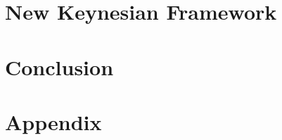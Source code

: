 \documentclass[12pt]{article}
\newcommand{\1}{\mathbbm 1}
\begin{document}
		
		\newpage
		
		
			
		
		\section{New Keynesian Framework}
		
		\newpage
		
		\section{Conclusion}
		
		
		
		
		\newpage
		
		
		
		
		
		\section{Appendix}
		
	
	
	\newpage
	\singlespacing
	\newpage
	
	
	\clearpage
	
	
	
	
	
	
	
	
	
\end{document}
